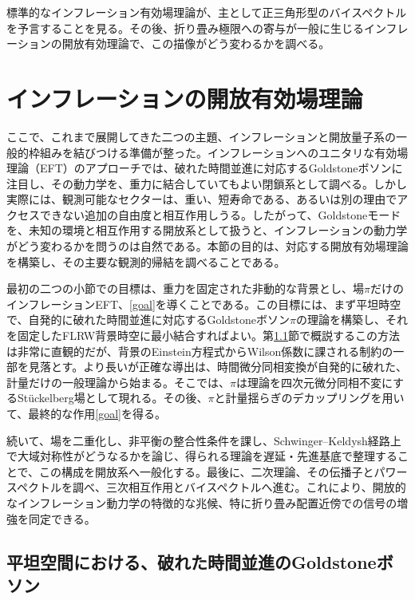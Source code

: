 \documentclass[a4paper,11pt,oneside]{article}
\theoremstyle{definition}
\numberwithin{equation}{section}
\begin{document}
標準的なインフレーション有効場理論が、主として正三角形型のバイスペクトルを予言することを見る。その後、折り畳み極限への寄与が一般に生じるインフレーションの開放有効理論で、この描像がどう変わるかを調べる。





\section{インフレーションの開放有効場理論}\label{sec:6}



ここで、これまで展開してきた二つの主題、インフレーションと開放量子系の一般的枠組みを結びつける準備が整った。インフレーションへのユニタリな有効場理論（EFT）のアプローチでは、破れた時間並進に対応するGoldstoneボソンに注目し、その動力学を、重力に結合していてもよい閉鎖系として調べる。しかし実際には、観測可能なセクターは、重い、短寿命である、あるいは別の理由でアクセスできない追加の自由度と相互作用しうる。したがって、Goldstoneモードを、未知の環境と相互作用する開放系として扱うと、インフレーションの動力学がどう変わるかを問うのは自然である。本節の目的は、対応する開放有効場理論を構築し、その主要な観測的帰結を調べることである。



最初の二つの小節での目標は、重力を固定された非動的な背景とし、場$ \pi$だけのインフレーションEFT、\eqref{goal}を導くことである。この目標には、まず平坦時空で、自発的に破れた時間並進に対応するGoldstoneボソン$ \pi$の理論を構築し、それを固定したFLRW背景時空に最小結合すればよい。第\ref{sec:6p1}節で概説するこの方法は非常に直観的だが、背景のEinstein方程式からWilson係数に課される制約の一部を見落とす。より長いが正確な導出は、時間微分同相変換が自発的に破れた、計量だけの一般理論から始まる。そこでは、$ \pi$は理論を四次元微分同相不変にするSt\"uckelberg場として現れる。その後、$ \pi$と計量揺らぎのデカップリングを用いて、最終的な作用\eqref{goal}を得る。



続いて、場を二重化し、非平衡の整合性条件を課し、Schwinger--Keldysh経路上で大域対称性がどうなるかを論じ、得られる理論を遅延・先進基底で整理することで、この構成を開放系へ一般化する。最後に、二次理論、その伝播子とパワースペクトルを調べ、三次相互作用とバイスペクトルへ進む。これにより、開放的なインフレーション動力学の特徴的な兆候、特に折り畳み配置近傍での信号の増強を同定できる。





\subsection{平坦空間における、破れた時間並進のGoldstoneボソン}\label{sec:6p1}
\end{document}
